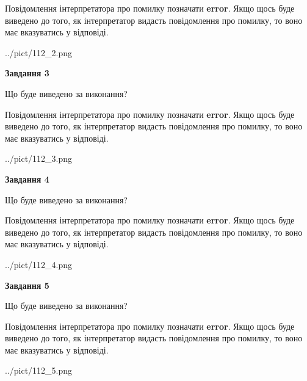 \documentclass[12pt, ukrainian]{article}
\begin{document}
{\begin {large}
Повідомлення інтерпретатора про помилку позначати \textbf{error}.
Якщо щось буде виведено до того, як інтерпретатор видасть повідомлення про помилку, 
то воно має вказуватись у відповіді. \par


\begin{center}
	{../pict/112_2.png}
\end{center}
\newpage

{\begin {center}\textbf{Завдання 3}\end {center}}\par
Що буде виведено за виконання?

Повідомлення інтерпретатора про помилку позначати \textbf{error}.
Якщо щось буде виведено до того, як інтерпретатор видасть повідомлення про помилку, 
то воно має вказуватись у відповіді. \par


\begin{center}
	{../pict/112_3.png}
\end{center}
\newpage

{\begin {center}\textbf{Завдання 4}\end {center}}\par
Що буде виведено за виконання?

Повідомлення інтерпретатора про помилку позначати \textbf{error}.
Якщо щось буде виведено до того, як інтерпретатор видасть повідомлення про помилку, 
то воно має вказуватись у відповіді. \par


\begin{center}
	{../pict/112_4.png}
\end{center}
\newpage

{\begin {center}\textbf{Завдання 5}\end {center}}\par
Що буде виведено за виконання?

Повідомлення інтерпретатора про помилку позначати \textbf{error}.
Якщо щось буде виведено до того, як інтерпретатор видасть повідомлення про помилку, 
то воно має вказуватись у відповіді. \par


\begin{center}
	{../pict/112_5.png}
\end{center}
\newpage


\end{large}}
\end{document}
